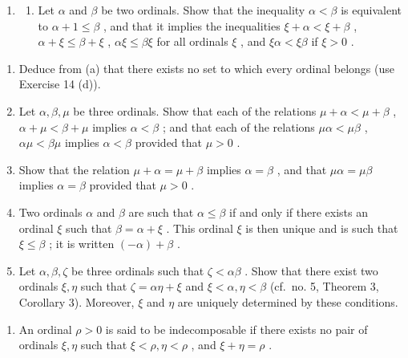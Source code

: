 \begin{enumerate}
\def\labelenumi{\arabic{enumi}.}
\setcounter{enumi}{14}
\tightlist
\item
  \begin{enumerate}
  \def\labelenumii{(\alph{enumii})}
  \tightlist
  \item
    Let \(\alpha\) and \(\beta\) be two ordinals. Show that the inequality \(\alpha < \beta\) is equivalent to \(\alpha + 1 \leqslant \beta\) , and that it implies the inequalities \(\xi + \alpha < \xi + \beta\) , \(\alpha + \xi \leqslant \beta + \xi\) , \(\alpha\xi \leqslant \beta\xi\) for all ordinals \(\xi\) , and \(\xi\alpha < \xi\beta\) if \(\xi > 0\) .
  \end{enumerate}
\end{enumerate}

\begin{enumerate}
\def\labelenumi{(\alph{enumi})}
\setcounter{enumi}{1}
\item
  Deduce from (a) that there exists no set to which every ordinal belongs (use Exercise 14 (d)).
\item
  Let \(\alpha, \beta, \mu\) be three ordinals. Show that each of the relations \(\mu + \alpha < \mu + \beta\) , \(\alpha + \mu < \beta + \mu\) implies \(\alpha < \beta\) ; and that each of the relations \(\mu \alpha < \mu \beta\) , \(\alpha \mu < \beta \mu\) implies \(\alpha < \beta\) provided that \(\mu > 0\) .
\item
  Show that the relation \(\mu + \alpha = \mu + \beta\) implies \(\alpha = \beta\) , and that \(\mu \alpha = \mu \beta\) implies \(\alpha = \beta\) provided that \(\mu > 0\) .
\item
  Two ordinals \(\alpha\) and \(\beta\) are such that \(\alpha \leqslant \beta\) if and only if there exists an ordinal \(\xi\) such that \(\beta = \alpha + \xi\) . This ordinal \(\xi\) is then unique and is such that \(\xi \leqslant \beta\) ; it is written \((- \alpha) + \beta\) .
\item
  Let \(\alpha, \beta, \zeta\) be three ordinals such that \(\zeta < \alpha\beta\) . Show that there exist two ordinals \(\xi, \eta\) such that \(\zeta = \alpha\eta + \xi\) and \(\xi < \alpha, \eta < \beta\) (cf.~no. 5, Theorem 3, Corollary 3). Moreover, \(\xi\) and \(\eta\) are uniquely determined by these conditions.
\end{enumerate}

\begin{enumerate}
\def\labelenumi{\arabic{enumi}.}
\setcounter{enumi}{15}
\tightlist
\item
  An ordinal \(\rho > 0\) is said to be indecomposable if there exists no pair of ordinals \(\xi, \eta\) such that \(\xi < \rho, \eta < \rho\) , and \(\xi + \eta = \rho\) .
\end{enumerate}

